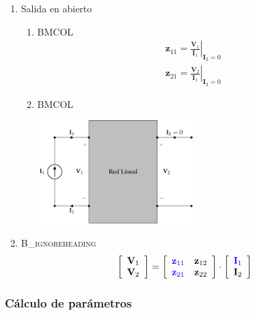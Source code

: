 \begin{enumerate}
\item Salida en abierto
\label{sec:org2d081df}

\begin{enumerate}
\item \hfill{}\textsc{BMCOL}
\label{sec:orgb2e3e30}
\renewcommand{\arraystretch}{2}
\[
  \begin{array}{c}
    \mathbf{z}_{11} = \left.\frac{\mathbf{V}_1}{\mathbf{I}_1}\right\rvert_{\mathbf{I}_2 = 0} \\
    \mathbf{z}_{21} = \left.\frac{\mathbf{V}_2}{\mathbf{I}_1}\right\rvert_{\mathbf{I}_2 = 0}
  \end{array}
\]

\item \hfill{}\textsc{BMCOL}
\label{sec:orgd3d533a}
\begin{center}
\includegraphics[height=4cm]{../figs/parametrosZ_entrada.pdf}
\end{center}
\end{enumerate}

\item \hfill{}\textsc{B\_ignoreheading}
\label{sec:orgb41b705}
\[
  \left[
    \begin{array}{c}
      \mathbf{V}_1\\
      \mathbf{V}_2
    \end{array}
  \right] =
  \left[
    \begin{array}{cc}
      \color{blue}{\mathbf{z}_{11}} & \mathbf{z}_{12}\\
      \color{blue}{\mathbf{z}_{21}} & \mathbf{z}_{22}
    \end{array}
  \right] \cdot
  \left[
    \begin{array}{c}
      \color{blue}{\mathbf{I}_1}\\
      \mathbf{I}_2
    \end{array}
  \right]
\]
\end{enumerate}

\subsubsection{Cálculo de parámetros}
\label{sec:org4ab5ebf}


